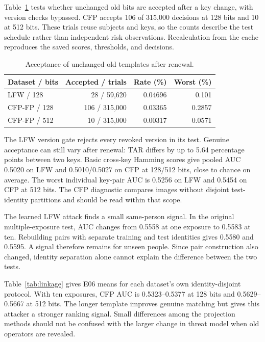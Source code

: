 Table~\ref{tab:replay} tests whether unchanged old bits are accepted after a key change, with version checks bypassed. CFP accepts 106 of 315,000 decisions at 128 bits and 10 at 512 bits. These trials reuse subjects and keys, so the counts describe the test schedule rather than independent risk observations. Recalculation from the cache reproduces the saved scores, thresholds, and decisions.

\begin{table}[t]
\caption{Acceptance of unchanged old templates after renewal.}
\label{tab:replay}\centering\small
\begin{tabular}{@{}lrrr@{}}\toprule
Dataset / bits & Accepted / trials & Rate (\%) & Worst (\%)\\\midrule
LFW / 128 & 28 / 59,620 & 0.04696 & 0.101\\
CFP-FP / 128 & 106 / 315,000 & 0.03365 & 0.2857\\
CFP-FP / 512 & 10 / 315,000 & 0.00317 & 0.0571\\\bottomrule
\end{tabular}
\end{table}

The LFW version gate rejects every revoked version in its test. Genuine acceptance can still vary after renewal: TAR differs by up to 5.64 percentage points between two keys. Basic cross-key Hamming scores give pooled AUC 0.5020 on LFW and 0.5010/0.5027 on CFP at 128/512 bits, close to chance on average. The worst individual key-pair AUC is 0.5256 on LFW and 0.5454 on CFP at 512 bits. The CFP diagnostic compares images without disjoint test-identity partitions and should be read within that scope.


The learned LFW attack finds a small same-person signal. In the original multiple-exposure test, AUC changes from 0.5558 at one exposure to 0.5583 at ten. Rebuilding pairs with separate training and test identities gives 0.5580 and 0.5595. A signal therefore remains for unseen people. Since pair construction also changed, identity separation alone cannot explain the difference between the two tests.

Table~\ref{tab:linkage} gives E06 means for each dataset's own identity-disjoint protocol. With ten exposures, CFP AUC is 0.5323--0.5377 at 128 bits and 0.5629--0.5667 at 512 bits. The longer template improves genuine matching but gives this attacker a stronger ranking signal. Small differences among the projection methods should not be confused with the larger change in threat model when old operators are revealed.

